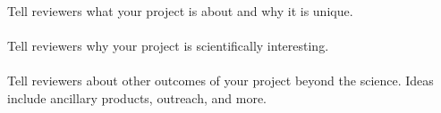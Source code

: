 \\

\noindent Tell reviewers what your project is about and why it is unique.\\

\\

\noindent Tell reviewers why your project is scientifically interesting.\\

\\

\noindent Tell reviewers about other outcomes of your project beyond the science. Ideas include ancillary products, outreach, and more.
